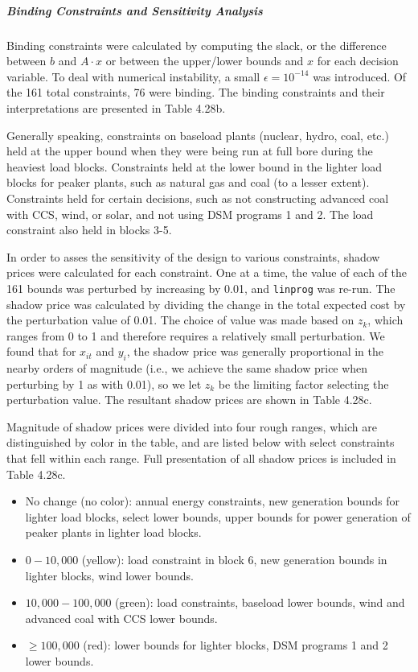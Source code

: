 \documentclass{article}
\begin{document}
	\subparagraph{Binding Constraints and Sensitivity Analysis}
		Binding constraints were calculated by computing the slack, or the difference between $b$ and $A \cdot x$ or between the upper/lower bounds and $x$ for each decision variable. To deal with numerical instability, a small $\epsilon = 10^{-14}$ was introduced. Of the 161 total constraints, 76 were binding. The binding constraints and their interpretations are presented in Table 4.28b. 
		
		Generally speaking, constraints on baseload plants (nuclear, hydro, coal, etc.) held at the upper bound when they were being run at full bore during the heaviest load blocks. Constraints held at the lower bound in the lighter load blocks for peaker plants, such as natural gas and coal (to a lesser extent). Constraints held for certain decisions, such as not constructing advanced coal with CCS, wind, or solar, and not using DSM programs 1 and 2. The load constraint also held in blocks 3-5. 
		
		In order to asses the sensitivity of the design to various constraints, shadow prices were calculated for each constraint. One at a time, the value of each of the 161 bounds was perturbed by increasing by 0.01, and \texttt{linprog} was re-run. The shadow price was calculated by dividing the change in the total expected cost by the perturbation value of 0.01. The choice of value was made based on $z_k$, which ranges from 0 to 1 and therefore requires a relatively small perturbation. We found that for $x_{it}$ and $y_i$, the shadow price was generally proportional in the nearby orders of magnitude (i.e., we achieve the same shadow price when perturbing by 1 as with 0.01), so we let $z_k$ be the limiting factor selecting the perturbation value. The resultant shadow prices are shown in Table 4.28c.
		
		Magnitude of shadow prices were divided into four rough ranges, which are distinguished by color in the table, and are listed below with select constraints that fell within each range. Full presentation of all shadow prices is included in Table 4.28c.
		
		\begin{itemize}
		\item No change (no color): annual energy constraints, new generation bounds for lighter load blocks, select lower bounds, upper bounds for power generation of peaker plants in lighter load blocks.
		\item $ 0 - 10,000$ (yellow): load constraint in block 6, new generation bounds in lighter blocks, wind lower bounds.
		\item $ 10,000 - 100,000$ (green): load constraints, baseload lower bounds, wind and advanced coal with CCS lower bounds.
		\item $\geq 100,000$ (red): lower bounds for lighter blocks, DSM programs 1 and 2 lower bounds.
		\end{itemize}
		
\end{document}
